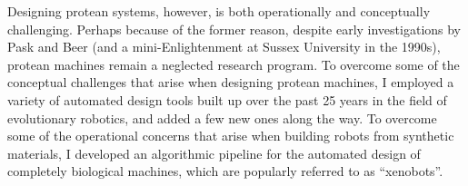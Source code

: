 




Designing protean systems, however, is both operationally and conceptually challenging.
Perhaps because of the former reason, despite early investigations by Pask and Beer (and a mini-Enlightenment at Sussex University in the 1990s), protean machines remain a neglected research program.
To overcome some of the conceptual challenges that arise when designing protean machines,
I employed a variety of automated design tools built up over the past 25 years in the field of evolutionary robotics, and added a few new ones along the way.
To overcome some of the operational concerns that arise when building robots from synthetic materials,
I developed an algorithmic pipeline for the 
automated design of completely biological machines,
which are popularly referred to as ``xenobots''.


